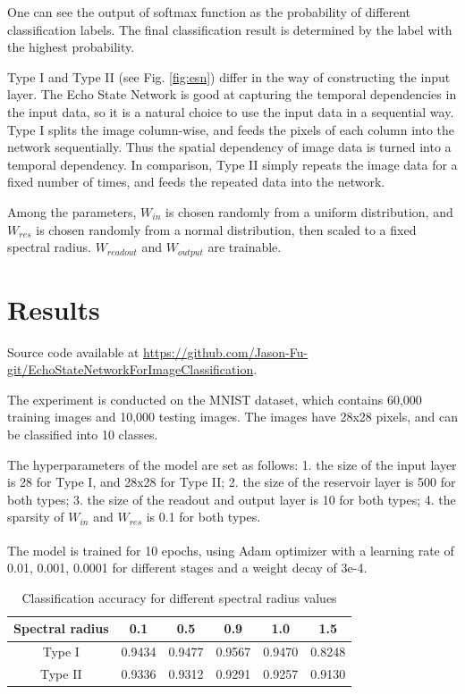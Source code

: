\documentclass{article}
\newcommand{\upcite}[1]{\textsuperscript{\cite{#1}}} %
\begin{document}
One can see the output of softmax function as the probability of different classification labels.
The final classification result is determined by the label with the highest probability.

Type I and Type II (see Fig. \ref{fig:esn}) differ in the way of constructing the input layer.
The Echo State Network is good at capturing the temporal dependencies in the input data, so
it is a natural choice to use the input data in a sequential way. Type I splits 
the image column-wise, and feeds the pixels of each column into the network sequentially.
Thus the spatial dependency of image data is turned into a temporal dependency. In comparison,
Type II simply repeats the image data for a fixed number of times, 
and feeds the repeated data into the network. 

Among the parameters, $W_{in}$ is chosen randomly from a uniform distribution,
and $W_{res}$ is chosen randomly from a normal distribution, then scaled to a fixed spectral radius.
$W_{readout}$ and $W_{output}$ are trainable.

\section{Results} 
\label{sec:results}

Source code available at \url{https://github.com/Jason-Fu-git/EchoStateNetworkForImageClassification}.

The experiment is conducted on the MNIST dataset, which contains 60,000 training images 
and 10,000 testing images. The images have 28x28 pixels, and can be classified into 10 classes.

The hyperparameters of the model are set as follows: 1. the size of the input layer is 28 for Type I, and 
28x28 for Type II; 2. the size of the reservoir layer is 500 for both types; 3. the size of 
the readout and output layer is 10 for both types; 4. the sparsity of $W_{in}$ and $W_{res}$ is 0.1
for both types.

The model is trained for 10 epochs, using Adam\upcite{Adam} optimizer with a learning rate of 0.01, 0.001, 0.0001 for
different stages and a weight decay of 3e-4.

\begin{table}[htbp]
    \centering
    \caption{Classification accuracy for different spectral radius values}
    \begin{tabular}{c|ccccc}
        \hline
        Spectral radius & 0.1   & 0.5   & 0.9   & 1.0   & 1.5   \\ \hline
        Type I          & 0.9434 & 0.9477 & 0.9567 & 0.9470 & 0.8248 \\
        Type II         & 0.9336 & 0.9312 & 0.9291 & 0.9257 & 0.9130 \\ \hline
    \end{tabular}
    \label{tab:spectral_radius_clean}
\end{table}
\end{document}
